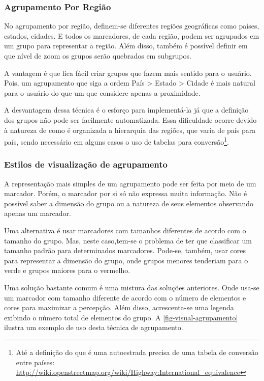 		\subsubsection{Agrupamento Por Região}
			No agrupamento por região, definem-se diferentes regiões geográficas como países, estados, cidades. E todos os marcadores, de cada região, podem ser agrupados em um grupo para representar a região. Além disso, também é possível definir em que nível de zoom os grupos serão quebrados em subgrupos. 
			
			A vantagem é que fica fácil criar grupos que fazem mais sentido para o usuário. Pois, um agrupamento que siga a ordem País > Estado > Cidade é mais natural para o usuário do que um que considere apenas a proximidade.
			
			A desvantagem dessa técnica é o esforço para implementá-la  \cite[p. 182]{livroGoogleApiV3} já que a definição dos grupos não pode ser facilmente automatizada. Essa dificuldade ocorre devido à natureza de como é organizada a hierarquia das regiões, que varia de país para país, sendo necessário em alguns casos o uso de tabelas para conversão\footnote{Até a definição do que é uma autoestrada precisa de uma tabela de conversão entre países: \url{http://wiki.openstreetmap.org/wiki/Highway:International_equivalence}}.
			
		\subsubsection{Estilos de visualização de agrupamento}
		A representação mais simples de um agrupamento pode ser feita por meio de um marcador. Porém, o marcador por si só não expressa muita informação. Não é possível saber a dimensão do grupo ou a natureza de seus elementos observando apenas um marcador.
		
		Uma alternativa é usar marcadores com tamanhos diferentes de acordo com o tamanho do grupo. Mas, neste caso,tem-se o problema de ter que classificar um tamanho padrão para determinados marcadores. Pode-se, também, usar cores para representar a dimensão do grupo, onde grupos menores tenderiam para o verde e grupos maiores para o vermelho.
		
		Uma solução bastante comum é uma mistura das soluções anteriores. Onde usa-se um marcador com tamanho diferente de acordo com o número de elementos e cores para maximizar a percepção. Além disso, acrescenta-se uma legenda exibindo o número total de elementos do grupo. A \autoref{fig-visual-agrupamento} ilustra um exemplo de uso desta técnica de agrupamento.
		
